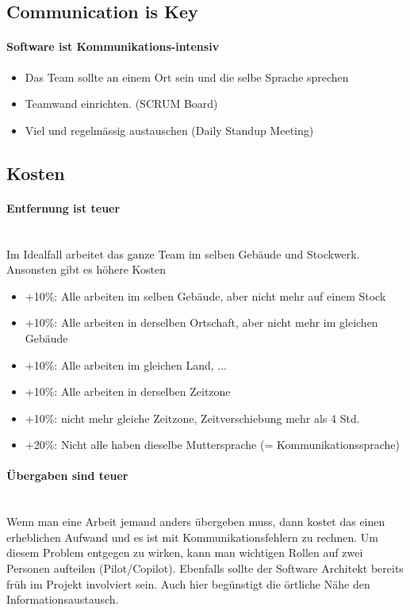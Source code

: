 \subsection{Communication is Key}
\paragraph{Software ist Kommunikations-intensiv} \hfill
\begin{itemize}
	\item Das Team sollte an einem Ort sein und die selbe Sprache sprechen
	\item Teamwand einrichten. (SCRUM Board)
	\item Viel und regelmässig austauschen (Daily Standup Meeting)	
\end{itemize}

\subsection{Kosten}
\paragraph{Entfernung ist teuer} \hfill \\
Im Idealfall arbeitet das ganze Team im selben Gebäude und Stockwerk. Ansonsten gibt es höhere Kosten
\begin{itemize}
	\item +10\%: Alle arbeiten im selben Gebäude, aber nicht mehr auf einem Stock
	\item +10\%: Alle arbeiten in derselben Ortschaft, aber nicht mehr im gleichen Gebäude
	\item +10\%: Alle arbeiten im gleichen Land, ...
	\item +10\%: Alle arbeiten in derselben Zeitzone
	\item +10\%: nicht mehr gleiche Zeitzone, Zeitverschiebung mehr als 4 Std.
	\item +20\%: Nicht alle haben dieselbe Muttersprache (= Kommunikationssprache)
\end{itemize}

\paragraph{Übergaben sind teuer} \hfill \\
Wenn man eine Arbeit jemand anders übergeben muss, dann kostet das einen erheblichen Aufwand und es ist mit Kommunikationsfehlern zu rechnen. Um diesem Problem entgegen zu wirken, kann man wichtigen Rollen auf zwei Personen aufteilen (Pilot/Copilot). Ebenfalls sollte der Software Architekt bereits früh im Projekt involviert sein. Auch hier begünstigt die örtliche Nähe den Informationsaustausch.

